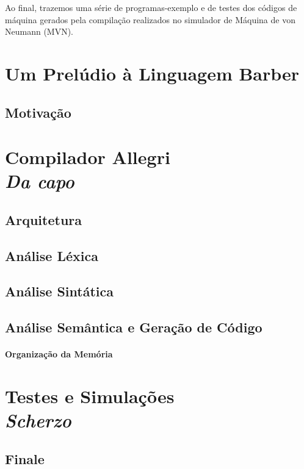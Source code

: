 \documentclass[a4paper,12pt]{report}
\begin{document}
    Ao final, trazemos uma série de programas-exemplo e de testes dos códigos de máquina gerados pela compilação realizados no simulador de Máquina de von Neumann (MVN).
    
    \part*{Um Prelúdio à Linguagem Barber}

    \chapter*{Motivação}
    
    \part*{Compilador Allegri\\\textit{Da capo}}
    \chapter*{Arquitetura}
    \chapter*{Análise Léxica}
    \chapter*{Análise Sintática}
    \chapter*{Análise Semântica e Geração de Código}
    \subsection*{Organização da Memória}

    \part*{Testes e Simulações\\\textit{Scherzo}}
    \chapter*{Finale}
\end{document}
